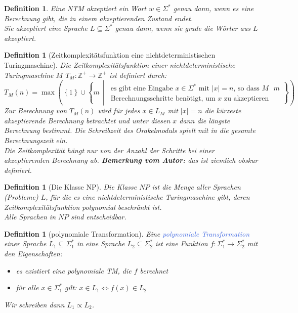 \documentclass[11pt]{scrartcl}
\newcommand{\tcol}[1]{\textcolor{RoyalBlue}{#1}}
\newcommand{\set}[1]{\left\lbrace #1\right\rbrace}
\theoremstyle{break}
\newtheorem{defi}[satz]{Definition}
\begin{document}
    \begin{defi}
        Eine NTM akzeptiert ein Wort $w\in\Sigma^*$ genau dann, wenn es eine Berechnung gibt, die in einem akzeptierenden Zustand endet.\\
        Sie akzeptiert eine Sprache $L\subseteq\Sigma^*$ genau dann, wenn sie grade die Wörter aus $L$ akzeptiert.
    \end{defi}

    \begin{defi}[Zeitkomplexitätsfunktion eine nichtdeterministischen Turingmaschine]
        Die Zeitkomplexitätsfunktion einer nichtdeterministische Turingmaschine $M$ $T_M\colon\mathbb{Z}^+\to\mathbb{Z}^+$ ist definiert durch:
        \[
            T_M(n)=\max\left(\set{1}\cup\set{m\,\middle|\,
            \begin{array}{c}
                \text{es gibt eine Eingabe $x\in\Sigma^*$ mit $|x|=n$, so dass $M$ $m$}\\
                \text{Berechnungsschritte benötigt, um $x$ zu akzeptieren}
            \end{array}}\right)
        \]
        Zur Berechnung von $T_M(n)$ wird für jedes $x\in L_M$ mit $|x|=n$ die kürzeste akzeptierende Berechnung betrachtet und unter diesen $x$ dann die längste Berechnung bestimmt.
        Die Schreibzeit des Orakelmoduls spielt mit in die gesamte Berechnungszeit ein.\\
        Die Zeitkomplexität hängt nur von der Anzahl der Schritte bei einer akzeptierenden Berechnung ab.
        \textbf{Bemerkung vom Autor:} das ist ziemlich obskur definiert.
    \end{defi}

    \begin{defi}[Die Klasse NP]
        Die Klasse $NP$ ist die Menge aller Sprachen (Probleme) $L$, für die es eine nichtdeterministische Turingmaschine gibt, deren Zeitkomplexitätsfunktion polynomial beschränkt ist.\\
        Alle Sprachen in $NP$ sind entscheidbar.
    \end{defi}

    \begin{defi}[polynomiale Transformation]
        Eine \tcol{polynomiale Transformation} einer Sprache $L_1\subseteq\Sigma_1^*$ in eine Sprache $L_2\subseteq\Sigma_2^*$ ist eine Funktion $f\colon\Sigma_1^*\to\Sigma_2^*$ mit den Eigenschaften:
        \begin{itemize}
            \item es existiert eine polynomiale TM, die $f$ berechnet
            \item für alle $x\in\Sigma_1^*$ gilt: $x\in L_1\Leftrightarrow f(x)\in L_2$
        \end{itemize}
        Wir schreiben dann $L_1\propto L_2$.
    \end{defi}
\end{document}
